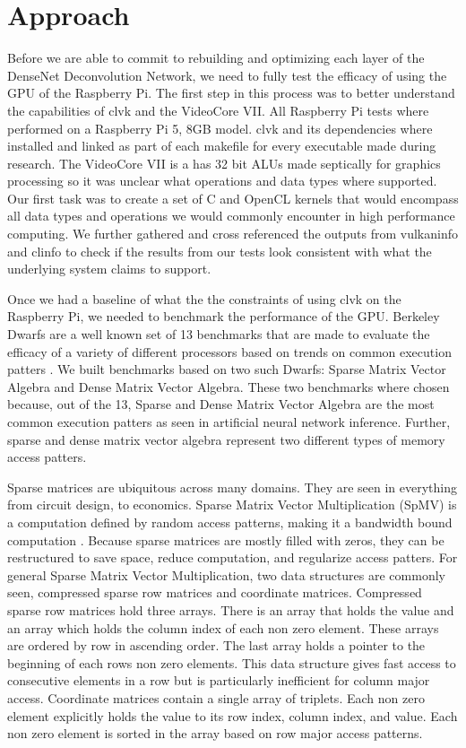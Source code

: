 \documentclass[conference]{IEEEtran}
\begin{document}
 \section{Approach}

 Before we are able to commit to rebuilding and optimizing each layer of the DenseNet Deconvolution Network,
 we need to fully test the efficacy of using the GPU of the Raspberry Pi. The first step in this process was to 
 better understand the capabilities of clvk and the VideoCore VII. All Raspberry Pi tests where performed on a 
 Raspberry Pi 5, 8GB model. clvk and its dependencies where installed and linked as part of each makefile for every 
 executable made during research. The VideoCore VII is a has 32 bit ALUs made septically for graphics processing so 
 it was unclear what operations and data types where supported. Our first task was to create a set of C and OpenCL kernels 
 that would encompass all data types and operations we would commonly encounter in high performance computing. We further 
 gathered and cross referenced the outputs from vulkaninfo and clinfo to check if the results from our tests look consistent 
 with what the underlying system claims to support.

 Once we had a baseline of what the the constraints of using clvk on the Raspberry Pi, we needed to benchmark the performance 
 of the GPU. Berkeley Dwarfs are a well known set of 13 benchmarks that are made to evaluate the efficacy of a variety of 
 different processors based on trends on common execution patters \cite{krommydas2016opendwarfs}. We built benchmarks based on two 
 such Dwarfs: Sparse Matrix Vector Algebra and Dense Matrix Vector Algebra. These two benchmarks where chosen because, 
 out of the 13, Sparse and Dense Matrix Vector Algebra are the most common execution patters as seen in artificial neural network 
 inference. Further, sparse and dense matrix vector algebra represent two different types of memory access patters. 

 Sparse matrices are ubiquitous across many domains. They are seen in everything from circuit design, to economics. Sparse 
 Matrix Vector Multiplication (SpMV) is a computation defined by random access patterns, making it a bandwidth bound computation \cite{filippone2017sparse}.
 Because sparse matrices are mostly filled with zeros, they can be restructured to save space, reduce computation, and regularize access patters.
 For general Sparse Matrix Vector Multiplication, two data structures are commonly seen, compressed sparse row matrices and 
 coordinate matrices. Compressed sparse row matrices hold three arrays. There is an array that holds the 
 value and an array which holds the column index of each non zero element. These arrays are ordered by row in ascending order. 
 The last array holds a pointer to the beginning of each rows non zero elements. This data structure gives fast access to consecutive 
 elements in a row but is particularly inefficient for column major access. Coordinate matrices contain a single array of triplets. Each 
 non zero element explicitly holds the value to its row index, column index, and value. Each non zero element is sorted in the array 
 based on row major access patterns.
\end{document}
